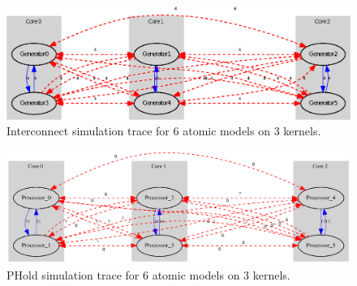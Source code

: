 \begin{figure}
    \center
    \includegraphics[width=\plotfraction\columnwidth]{fig/interconnect_parallel_allocation.eps}
    \caption{Interconnect simulation trace for 6 atomic models on 3 kernels.}
    \label{fig:interconnect_allocation_parallel}
\end{figure}

\begin{figure}
    \center
    \includegraphics[width=\plotfraction\columnwidth]{fig/phold_parallel_allocation.eps}
    \caption{PHold simulation trace for 6 atomic models on 3 kernels.}
    \label{fig:phold_allocation}
\end{figure}
